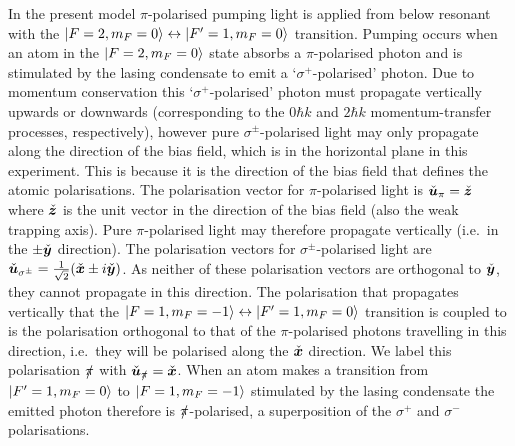 In the present model $\pi$-polarised pumping light is applied from below resonant with the ${\left|F=2, m_F=0\right>} \leftrightarrow {\ensuremath{\left|F'=1, m_F=0\right>}}$ transition.  Pumping occurs when an atom in the ${\left|F=2, m_F=0\right>}$ state absorbs a $\pi$-polarised photon and is stimulated by the lasing condensate to emit a `$\sigma^+$-polarised' photon.  Due to momentum conservation this `$\sigma^+$-polarised' photon must propagate vertically upwards or downwards (corresponding to the $0\hbar k$ and $2 \hbar k$ momentum-transfer processes, respectively), however pure $\sigma^\pm$-polarised light may only propagate along the direction of the bias field, which is in the horizontal plane in this experiment.  This is because it is the direction of the bias field that defines the atomic polarisations.  The polarisation vector for $\pi$-polarised light is $\check{\bm{u}}_\pi = \check{\bm{z}}$ where $\check{\bm{z}}$ is the unit vector in the direction of the bias field (also the weak trapping axis).  Pure $\pi$-polarised light may therefore propagate vertically (i.e.\ in the $\pm \check{\bm{y}}$ direction).  The polarisation vectors for $\sigma^\pm$-polarised light are $\check{\bm{u}}_{\sigma^\pm} = \frac{1}{\sqrt{2}} (\check{\bm{x}} \pm i \check{\bm{y}})$.  As neither of these polarisation vectors are orthogonal to $\check{\bm{y}}$, they cannot propagate in this direction.  The polarisation that propagates vertically that the ${\left|F=1, m_F=-1\right>} \leftrightarrow {\ensuremath{\left|F'=1, m_F=0\right>}}$ transition is coupled to is the polarisation orthogonal to that of the $\pi$-polarised photons travelling in this direction, i.e.\ they will be polarised along the $\check{\bm{x}}$ direction.  We label this polarisation $\slashed{\pi}$ with $\check{\bm{u}}_{\slashed{\pi}} = \check{\bm{x}}$.  When an atom makes a transition from ${\left|F'=1, m_F=0\right>}$ to ${\left|F=1, m_F=-1\right>}$ stimulated by the lasing condensate the emitted photon therefore is $\slashed{\pi}$-polarised, a superposition of the $\sigma^+$ and $\sigma^-$ polarisations.

